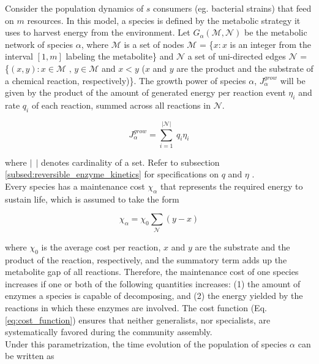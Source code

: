 \documentclass[titlepage,11pt]{article}
\begin{document}
\begin{linenumbers}
\begin{singlespace}
				Consider the population dynamics of $ s $ consumers (eg. bacterial strains) that feed on $ m $ resources. In this model,  a species  is defined by the metabolic strategy it uses to harvest energy from the environment. Let $ G_{\alpha}(\mathcal{M}, \mathcal{N}) $ be the metabolic network of species $ \alpha $, where $ \mathcal{M} $ is a set of nodes $ \mathcal{M}  $ = \{$x:x $ is an integer from the interval $ [1, m]  $ labeling the metabolite\} and $ \mathcal{N} $ a set of uni-directed edges $ \mathcal{N}  $ = \{$ (x, y): x \in \mathcal{M} \textrm{ , } y \in \mathcal{M} $ and $ x < y $ ($ x $ and $ y $ are the product and the substrate of a chemical reaction, respectively)\}. The growth power of species $ \alpha $,  $ J^{grow}_{\alpha}$ will be given by the product of the amount of generated energy per reaction event $ \eta_{i} $ and rate $ q_{i} $ of each reaction, summed across all reactions in $ \mathcal{N} $.
				\begin{linenomath*}	
					\begin{equation}
					J^{grow}_{\alpha} = \sum_{i = 1}^{|\mathcal{N}|} \ q_i \eta_i
					\end{equation}
				\end{linenomath*}
				where $ | \ \ | $ denotes cardinality of a set. Refer to subsection \ref{subsed:reversible_enzyme_kinetics} for specifications on $ q $ and  $ \eta $ .\\
				Every species has a maintenance cost $ \chi_{\alpha} $ that represents the required energy to sustain life, which is assumed to take the form
				\begin{linenomath*}	
					\begin{equation}\label{eq:cost_function}
					\chi_{\alpha} = \chi_0\sum_{\mathcal{N}}(y - x)
					\end{equation}
				\end{linenomath*}
				where $ \chi_0 $ is the average cost per reaction, $ x $ and $ y $ are the substrate and the product of the reaction, respectively, and the summatory term adds up the metabolite gap of all reactions. Therefore, the maintenance cost of one species increases if one or both of the following quantities increases: (1) the amount of enzymes a species is capable of decomposing, and (2) the energy yielded by the reactions in which these enzymes are involved. The cost function (Eq. \ref{eq:cost_function}) ensures that neither generalists, nor specialists, are systematically favored during the community assembly.\\
				Under this parametrization, the time evolution of the population of species $ \alpha $ can be written as

\end{singlespace}
\end{linenumbers}
\end{document}
